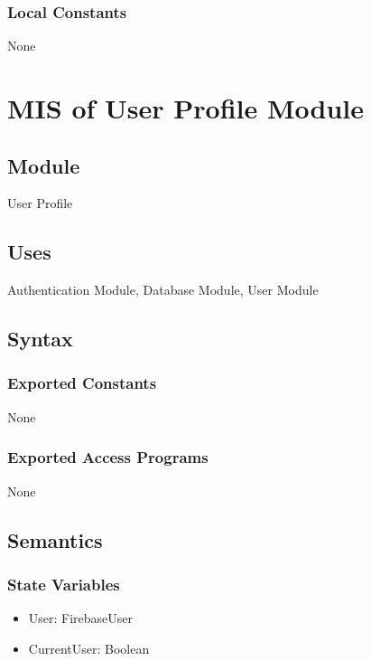 \documentclass[12pt, titlepage]{article}
\begin{document}
\subsubsection{Local Constants}

None

\newpage

\section{MIS of User Profile Module} \label{mUP}

\subsection{Module}

User Profile

\subsection{Uses}

Authentication Module, Database Module, User Module

\subsection{Syntax}

\subsubsection{Exported Constants}

None

\subsubsection{Exported Access Programs}

None

\subsection{Semantics}

\subsubsection{State Variables}

\begin{itemize}
\item User: FirebaseUser
\item CurrentUser: Boolean
\end{itemize}
\end{document}
